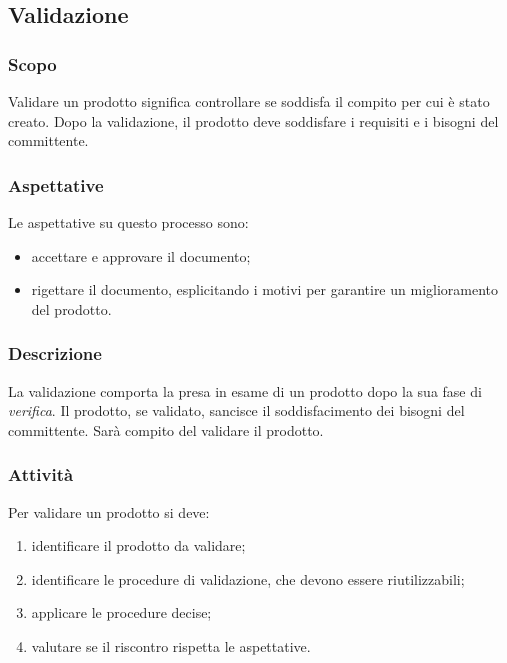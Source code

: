 \subsection{Validazione}\label{3.5}

\subsubsection{Scopo}\label{3.5.1}
Validare un prodotto significa controllare se soddisfa il compito per cui è stato creato. Dopo la validazione, il prodotto deve soddisfare i requisiti e i bisogni del committente.

\subsubsection{Aspettative}
Le aspettative su questo processo sono:
\begin{itemize}
	\item accettare e approvare il documento;
	\item rigettare il documento, esplicitando i motivi per garantire un miglioramento del prodotto.
\end{itemize}

\subsubsection{Descrizione}
La validazione comporta la presa in esame di un prodotto dopo la sua fase di \textit{verifica}. Il prodotto, se validato, sancisce il soddisfacimento dei bisogni del committente. Sarà compito del \respProg{} validare il prodotto.

\subsubsection{Attività}
Per validare un prodotto si deve:
\begin{enumerate}
	\item identificare il prodotto da validare;
	\item identificare le procedure di validazione, che devono essere riutilizzabili;
	\item applicare le procedure decise;
	\item valutare se il riscontro rispetta le aspettative.
\end{enumerate}


